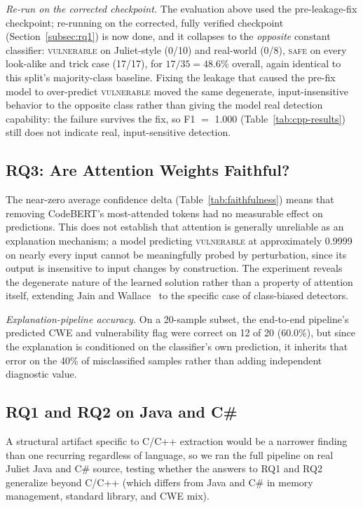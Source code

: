 \documentclass{ieeeaccess}
\begin{document}
\textit{Re-run on the corrected checkpoint.} The evaluation above used the pre-leakage-fix checkpoint; re-running on the corrected, fully verified checkpoint (Section~\ref{subsec:rq1}) is now done, and it collapses to the \emph{opposite} constant classifier: \textsc{vulnerable} on Juliet-style (0/10) and real-world (0/8), \textsc{safe} on every look-alike and trick case (17/17), for $17/35 = 48.6\%$ overall, again identical to this split's majority-class baseline. Fixing the leakage that caused the pre-fix model to over-predict \textsc{vulnerable} moved the same degenerate, input-insensitive behavior to the opposite class rather than giving the model real detection capability: the failure survives the fix, so F1 $=$ 1.000 (Table~\ref{tab:cpp-results}) still does not indicate real, input-sensitive detection.

\subsection{RQ3: Are Attention Weights Faithful?}
\label{subsec:rq3}
The near-zero average confidence delta (Table~\ref{tab:faithfulness}) means that removing CodeBERT's most-attended tokens had no measurable effect on predictions. This does not establish that attention is generally unreliable as an explanation mechanism; a model predicting \textsc{vulnerable} at approximately 0.9999 on nearly every input cannot be meaningfully probed by perturbation, since its output is insensitive to input changes by construction. The experiment reveals the degenerate nature of the learned solution rather than a property of attention itself, extending Jain and Wallace~\cite{ref25} to the specific case of class-biased detectors.

\textit{Explanation-pipeline accuracy.} On a 20-sample subset, the end-to-end pipeline's predicted CWE and vulnerability flag were correct on 12 of 20 (60.0\%), but since the explanation is conditioned on the classifier's own prediction, it inherits that error on the 40\% of misclassified samples rather than adding independent diagnostic value.

\subsection{RQ1 and RQ2 on Java and C\#}
\label{subsec:multilang-results}
A structural artifact specific to C/C++ extraction would be a narrower finding than one recurring regardless of language, so we ran the full pipeline on real Juliet Java and C\# source, testing whether the answers to RQ1 and RQ2 generalize beyond C/C++ (which differs from Java and C\# in memory management, standard library, and CWE mix).
\end{document}
